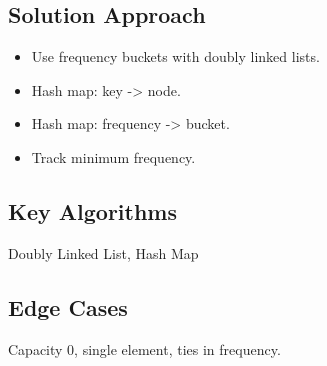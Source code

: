 \documentclass[10pt, a4paper]{article}
\begin{document}
\subsection*{Solution Approach}
\begin{itemize}
    \item Use frequency buckets with doubly linked lists.
    \item Hash map: key -> node.
    \item Hash map: frequency -> bucket.
    \item Track minimum frequency.
\end{itemize}

\subsection*{Key Algorithms}
Doubly Linked List, Hash Map

\subsection*{Edge Cases}
Capacity 0, single element, ties in frequency.
\end{document}

